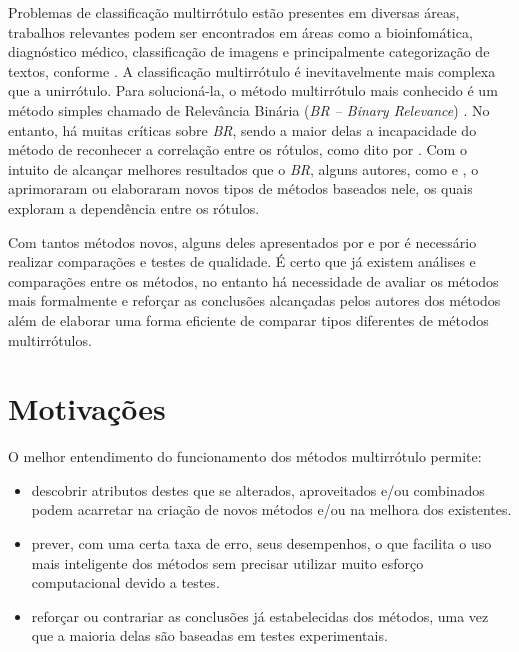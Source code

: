 Problemas de classificação multirrótulo estão presentes em diversas áreas, trabalhos relevantes podem
ser encontrados em áreas como a bioinfomática, diagnóstico médico, classificação de imagens e principalmente
categorização de textos, conforme \cite{carvalho2009}. A classificação multirrótulo é inevitavelmente
mais complexa que a unirrótulo. Para solucioná-la, o método multirrótulo mais conhecido é um método simples chamado de
Relevância Binária (\textit{BR – Binary Relevance}) \cite{carvalho2009}. 
No entanto, há muitas críticas sobre \textit{BR}, sendo a maior delas a incapacidade do método de reconhecer
a correlação entre os rótulos, como dito por \cite{pcc2010}.
Com o intuito de alcançar melhores resultados que o \textit{BR}, alguns autores, como \cite{cc2009} e \cite{dbr2014},
o aprimoraram ou elaboraram novos tipos de métodos baseados nele,
os quais exploram a dependência entre os rótulos. 

Com tantos métodos novos, alguns deles apresentados por \cite{carvalho2009}
e por \cite{cc2009} é necessário realizar comparações e testes de qualidade.
É certo que já existem análises e comparações entre os métodos,
no entanto há necessidade de avaliar os métodos mais formalmente
e reforçar as conclusões alcançadas pelos autores dos métodos além de elaborar
uma forma eficiente de comparar tipos diferentes de métodos multirrótulos.

\section{Motivações}
O melhor entendimento do funcionamento dos métodos multirrótulo permite:
\begin{itemize}
 \item descobrir atributos destes que se alterados, aproveitados
 e/ou combinados podem acarretar na criação de novos métodos e/ou na melhora dos existentes.
 \item prever, com uma certa taxa de erro, seus desempenhos, o que facilita o uso mais inteligente dos métodos
 sem precisar utilizar muito esforço computacional devido a testes.
 \item reforçar ou contrariar as conclusões já estabelecidas dos métodos, uma vez que a maioria delas são 
 baseadas em testes experimentais.
\end{itemize}

